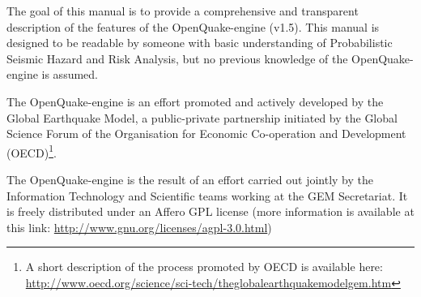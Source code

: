 The goal of this manual is to provide a comprehensive and transparent description of the features of the OpenQuake-engine (v1.5). This manual is designed to be readable by someone with basic understanding of Probabilistic Seismic Hazard and Risk Analysis, but no previous knowledge of the OpenQuake-engine is assumed.

The OpenQuake-engine is an effort promoted and actively developed by the Global Earthquake Model, a public-private partnership initiated by the Global Science Forum of the Organisation for Economic Co-operation and Development (OECD)\footnote{A short description of the process promoted by OECD is available here: \href{http://www.oecd.org/science/sci-tech/theglobalearthquakemodelgem.htm}{http://www.oecd.org/science/sci-tech/theglobalearthquakemodelgem.htm}}.

The OpenQuake-engine is the result of an effort carried out jointly by the Information Technology and Scientific teams working at the GEM Secretariat. It is freely distributed under an Affero GPL license (more information is available at this link: \href{http://www.gnu.org/licenses/agpl-3.0.html}{http://www.gnu.org/licenses/agpl-3.0.html})
